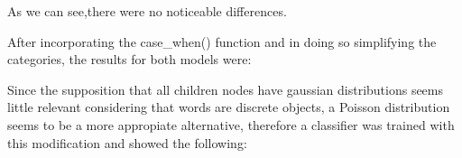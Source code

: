 \documentclass[twocolumn]{article}
\begin{document}
As we can see,there were no noticeable differences.


After incorporating the case\_when() function and in doing so simplifying the categories, the results for both models were:
\vspace{5cm}
\begin{table}[h]
\centering
\caption{Overall classifier performance metrics (simplified categories) e1071.}
\small
{}
\end{table}
\begin{table}[h]
\centering
\caption{Per-class precision, recall, F1 score, and support (simplified categories) e1071.}
\small
{}
\end{table}



Since the supposition that all children nodes have gaussian distributions seems little relevant considering that words are discrete objects, a Poisson distribution seems to be a more appropiate alternative, therefore a classifier was trained with this modification and showed the following:
\begin{table}[h]
\centering
\caption{Confusion matrix for simplified categories.}
\small
{}
\end{table}
\end{document}
